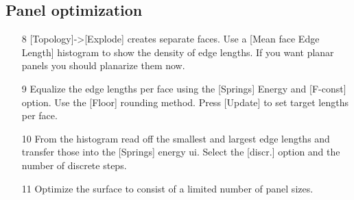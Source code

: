 \documentclass[Thesis.tex]{subfiles}
\begin{document}
\subsection{Panel optimization}

\begin{itemize}
\item[8] [Topology]->[Explode] creates separate faces. Use a [Mean face Edge Length] histogram to show the density of edge lengths. If you want planar panels you should planarize them now. \\
\item[9] Equalize the edge lengths per face using the [Springs] Energy and [F-const] option. Use the [Floor] rounding method. Press [Update] to set target lengths per face.\\
\item[10] From the histogram read off the smallest and largest edge lengths and transfer those into the [Springs] energy ui. Select the [discr.] option and the number of discrete steps.
\item[11] Optimize the surface to consist of a limited number of panel sizes.\\
\end{itemize}
\end{document}
